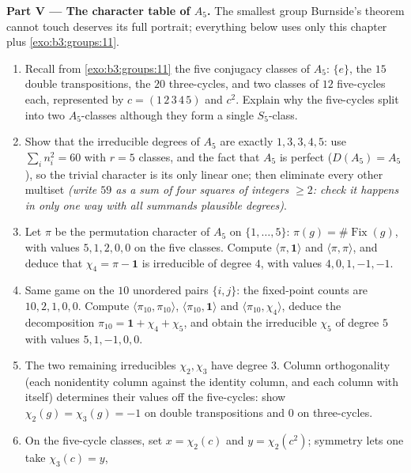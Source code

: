 \begin{problem}
\medskip
\noindent\textbf{Part V --- The character table of $A_5$.} The
smallest group Burnside's theorem cannot touch deserves its full
portrait; everything below uses only this chapter plus
\cref{exo:b3:groups:11}.
\begin{enumerate}[resume]
  \item Recall from \cref{exo:b3:groups:11} the five conjugacy
        classes of $A_5$: $\{e\}$, the $15$ double
        transpositions, the $20$ three-cycles, and two classes
        of $12$ five-cycles each, represented by $c =
        (1\,2\,3\,4\,5)$ and $c^2$. Explain why the five-cycles
        split into two $A_5$-classes although they form a single
        $S_5$-class.
  \item Show that the irreducible degrees of $A_5$ are exactly
        $1, 3, 3, 4, 5$: use $\sum_in_i^2 = 60$ with $r = 5$
        classes, and the fact that $A_5$ is perfect ($D(A_5) =
        A_5$), so the trivial character is its only linear one;
        then eliminate every other multiset \emph{(write $59$
        as a sum of four squares of integers $\geq 2$: check it
        happens in only one way with all summands plausible
        degrees)}.
  \item Let $\pi$ be the permutation character of $A_5$ on
        $\{1, \dots, 5\}$: $\pi(g) = \#\operatorname{Fix}(g)$,
        with values $5, 1, 2, 0, 0$ on the five classes. Compute
        $\langle\pi, \mathbf 1\rangle$ and $\langle\pi,
        \pi\rangle$, and deduce that $\chi_4 = \pi - \mathbf 1$
        is irreducible of degree $4$, with values $4, 0, 1, -1,
        -1$.
  \item Same game on the $10$ unordered pairs $\{i, j\}$: the
        fixed-point counts are $10, 2, 1, 0, 0$. Compute
        $\langle\pi_{10}, \pi_{10}\rangle$, $\langle\pi_{10},
        \mathbf 1\rangle$ and $\langle\pi_{10}, \chi_4\rangle$,
        deduce the decomposition $\pi_{10} = \mathbf 1 + \chi_4
        + \chi_5$, and obtain the irreducible $\chi_5$ of degree
        $5$ with values $5, 1, -1, 0, 0$.
  \item The two remaining irreducibles $\chi_2, \chi_3$ have
        degree $3$. Column orthogonality (each nonidentity
        column against the identity column, and each column with
        itself) determines their values off the five-cycles:
        show $\chi_2(g) = \chi_3(g) = -1$ on double
        transpositions and $0$ on three-cycles.
  \item On the five-cycle classes, set $x = \chi_2(c)$ and $y =
        \chi_2(c^2)$; symmetry lets one take $\chi_3(c) = y$,

\end{enumerate}
\end{problem}

